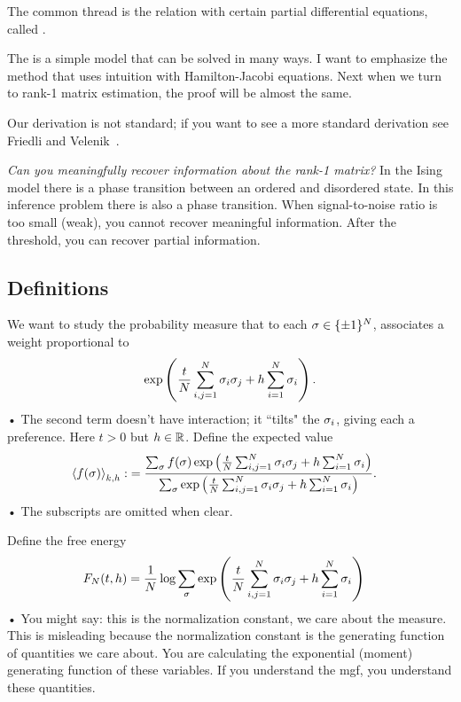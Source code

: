 The common thread is the relation with certain partial differential equations, called .

The  is a simple model that can be solved in many ways. I want to emphasize the method that uses intuition with Hamilton-Jacobi equations. Next when we turn to rank-1 matrix estimation, the proof will be almost the same. 

Our derivation is not standard; if you want to see a more standard derivation see Friedli and Velenik~\cite{friedli2017statistical}.

\emph{Can you meaningfully recover information about the rank-1 matrix?} In the Ising model there is a phase transition between an ordered and disordered state. In this inference problem there is also a phase transition. When signal-to-noise ratio is too small (weak), you cannot recover meaningful information. After the threshold, you can recover partial information. 



\subsection{Definitions}

We want to study the probability measure that to each $\sigma\in \{\pm1\}^N$, associates a weight proportional to 
\begin{align*}
\exp\left( {\frac{t}{N} \sum_{i,j=1}^{N} \sigma_i\sigma_j + h\sum_{i=1}^{N} \sigma_i} \right).
\end{align*}•
The second term doesn't have interaction; it ``tilts" the $\sigma_i$, giving each a preference. Here $t>0$ but $h\in \mathbb{R}$.
Define the expected value
\begin{align*}
\left\langle {f(\sigma)}\right\rangle_{k,h} :&= \frac{\sum_\sigma f(\sigma) \exp\left( {\frac{t}{N} \sum_{i,j=1}^{N} \sigma_i\sigma_j + h\sum_{i=1}^{N} \sigma_i} \right)}{\sum_\sigma \exp\left( {\frac{t}{N} \sum_{i,j=1}^{N} \sigma_i\sigma_j + h\sum_{i=1}^{N} \sigma_i} \right)}.
\end{align*}•
The subscripts are omitted when clear.

Define the free energy
\begin{align*}
F_N(t,h) &=\frac{1}{N} \log \sum_\sigma \exp\left( {\frac{t}{N} \sum_{i,j=1}^{N} \sigma_i\sigma_j + h\sum_{i=1}^{N} \sigma_i} \right)
\end{align*}•
You might say: this is the normalization constant, we care about the measure. This is misleading because the normalization constant is the generating function of quantities we care about. You are calculating the exponential (moment) generating function of these variables. If you understand the mgf, you understand these quantities.

